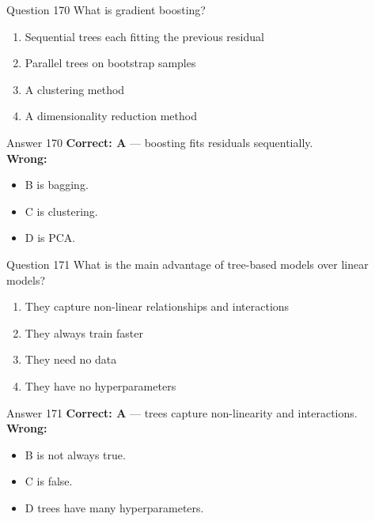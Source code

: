 \documentclass[aspectratio=169,11pt]{beamer}
\begin{document}
	\begin{frame}{Question 170}
		What is gradient boosting?
		\begin{enumerate}[label=\Alph*.]
			\item Sequential trees each fitting the previous residual
			\item Parallel trees on bootstrap samples
			\item A clustering method
			\item A dimensionality reduction method
		\end{enumerate}
	\end{frame}
	\begin{frame}{Answer 170}
		\textbf{Correct: A} --- boosting fits residuals sequentially.\\
		\vspace{0.5em}
		\textbf{Wrong:}
		\begin{itemize}
			\item B is bagging.
			\item C is clustering.
			\item D is PCA.
		\end{itemize}
	\end{frame}
	
	\begin{frame}{Question 171}
		What is the main advantage of tree-based models over linear models?
		\begin{enumerate}[label=\Alph*.]
			\item They capture non-linear relationships and interactions
			\item They always train faster
			\item They need no data
			\item They have no hyperparameters
		\end{enumerate}
	\end{frame}
	\begin{frame}{Answer 171}
		\textbf{Correct: A} --- trees capture non-linearity and interactions.\\
		\vspace{0.5em}
		\textbf{Wrong:}
		\begin{itemize}
			\item B is not always true.
			\item C is false.
			\item D trees have many hyperparameters.
		\end{itemize}
	\end{frame}
	
\end{document}
